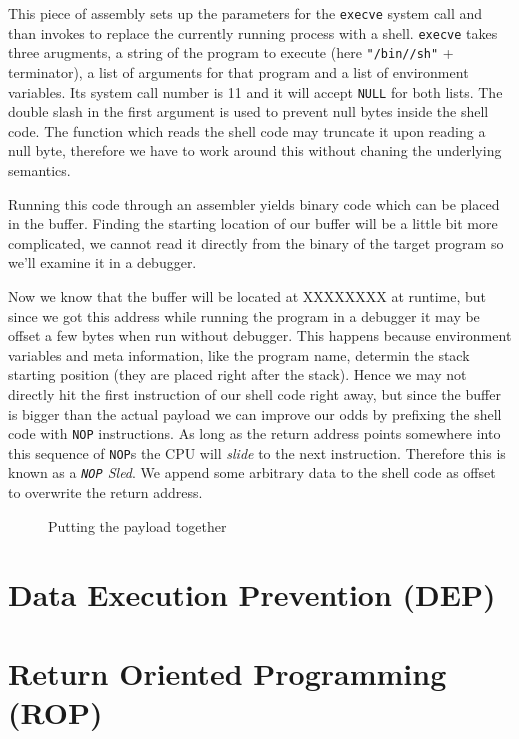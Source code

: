 \documentclass[article]{uibk}
\begin{document}
This piece of assembly sets up the parameters for the \texttt{execve} system
call and than invokes to replace the currently running process with a shell.
\texttt{execve} takes three arugments, a string of the program to execute (here
\texttt{"/bin//sh"} + terminator), a list of arguments for that program and a
list of environment variables. Its system call number is 11 and it will accept
\texttt{NULL} for both lists. The double slash in the first argument is used to
prevent null bytes inside the shell code. The function which reads the shell
code may truncate it upon reading a null byte, therefore we have to work around
this without chaning the underlying semantics.

Running this code through an assembler yields binary code which can be placed
in the buffer. Finding the starting location of our buffer will be a little bit
more complicated, we cannot read it directly from the binary of the target
program so we'll examine it in a debugger.

Now we know that the buffer will be located at XXXXXXXX at runtime, but since
we got this address while running the program in a debugger it may be offset a
few bytes when run without debugger. This happens because environment variables
and meta information, like the program name, determin the stack starting
position (they are placed right after the stack). Hence we may not directly hit
the first instruction of our shell code right away, but since the buffer is
bigger than the actual payload we can improve our odds by prefixing the shell
code with \texttt{NOP} instructions. As long as the return address points
somewhere into this sequence of \texttt{NOP}s the CPU will \emph{slide} to the
next instruction. Therefore this is known as a \textit{\texttt{NOP} Sled}. We
append some arbitrary data to the shell code as offset to overwrite the return
address.

\begin{figure}[H]
    \centering
    
    \caption{Putting the payload together}
    \label{fig:shell_code}
\end{figure}

\newpage

\section{Data Execution Prevention (DEP)}

\section{Return Oriented Programming (ROP)}
\end{document}
